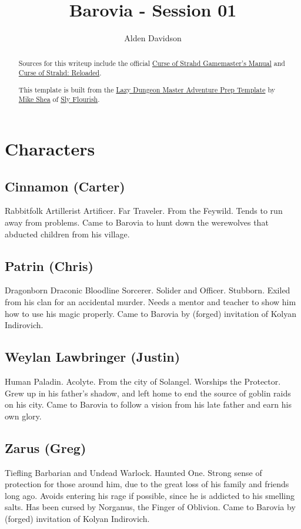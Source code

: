 \documentclass[a4paper,11pt]{article}
\title{Barovia - Session 01}
\author{Alden Davidson}
\begin{document}
\maketitle
\tableofcontents

\begin{abstract}
  Sources for this writeup include the official
  \href{https://5e.tools/adventure.html#cos}{Curse of Strahd Gamemaster's Manual} and
  \href{https://www.reddit.com/r/CurseofStrahd/comments/9bpzbh/curse_of_strahd_reloaded_compilation_thread/}{Curse of Strahd: Reloaded}.
  
  This template is built from the
  \href{https://slyflourish.com/rotldm_template.html}{Lazy Dungeon Master Adventure Prep Template} by
  \href{https://slyflourish.com/about_mike_shea.html}{Mike Shea} of \href{https://slyflourish.com/}{Sly Flourish}.
\end{abstract}

\pagebreak
\section{Characters}
\label{sec:Characters}
\subsection{Cinnamon (Carter)}
  Rabbitfolk Artillerist Artificer. Far Traveler. From the Feywild. Tends to run away from problems. Came to
  Barovia to hunt down the werewolves that abducted children from his village.
\subsection{Patrin (Chris)}
  Dragonborn Draconic Bloodline Sorcerer. Solider and Officer. Stubborn. Exiled from his clan for an accidental 
  murder. Needs a mentor and teacher to show him how to use his magic properly. Came to Barovia by (forged)
  invitation of Kolyan Indirovich.
\subsection{Weylan Lawbringer (Justin)}
  Human Paladin. Acolyte. From the city of Solangel. Worships the Protector. Grew up in his father's shadow, and 
  left home to end the source of goblin raids on his city. Came to Barovia to follow a vision from his late 
  father and earn his own glory.
\subsection{Zarus (Greg)}
  Tiefling Barbarian and Undead Warlock. Haunted One. Strong sense of protection for those around him, due to the
  great loss of his family and friends long ago. Avoids entering his rage if possible, since he is addicted to 
  his smelling salts. Has been cursed by Norganus, the Finger of Oblivion. Came to Barovia by (forged) 
  invitation of Kolyan Indirovich.
\end{document}

